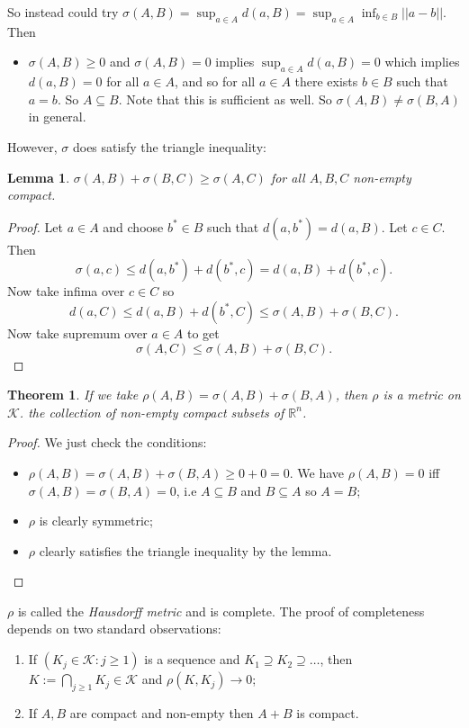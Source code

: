 \documentclass[a4paper, 10pt, twocolumn]{amsart}
\newtheorem*{theorem}{Theorem}
\newtheorem*{lemma}{Lemma}
\theoremstyle{definition}
\newcommand{\bb}[1]{\mathbb{#1}}
\newcommand{\sbs}[0]{\subseteq}
\renewcommand{\cal}[1]{\mathcal{#1}}
\newcommand{\1}{\mathbbm{1}}
\begin{document}
So instead could try $\sigma(A,B) = \sup_{a \in A} d(a,B) = \sup_{a \in A} \inf_{b \in B} ||a-b||$. Then \begin{itemize}
    \item $\sigma(A,B) \ge 0$ and $\sigma(A,B) = 0$ implies $\sup_{a \in A} d(a,B) = 0$ which implies $d(a,B) = 0$ for all $a \in A$, and so for all $a \in A$ there exists $b \in B$ such that $a=b$. So $A \sbs B$. Note that this is sufficient as well. So $\sigma(A,B) \ne \sigma(B,A)$ in general.
\end{itemize}

However, $\sigma$ does satisfy the triangle inequality: 

\begin{lemma}
    $\sigma(A,B)+\sigma(B,C) \ge \sigma(A,C)$ for all $A,B,C$ non-empty compact.
\end{lemma}

\begin{proof}
    Let $a \in A$ and choose $b^\ast \in B$ such that $d(a,b^\ast) = d(a,B)$. Let $c \in C$. Then \[\sigma(a,c) \le d(a,b^\ast) + d(b^\ast,c) = d(a,B) + d(b^\ast,c).\]
    Now take infima over $c \in C$ so \[d(a,C) \le d(a,B)+ d(b^\ast,C) \le \sigma(A,B) + \sigma(B,C).\]
    Now take supremum over $a \in A$ to get \[\sigma(A,C) \le \sigma(A,B)+\sigma(B,C).\]
\end{proof}

\begin{theorem}
    If we take $\rho(A,B) = \sigma(A,B)+\sigma(B,A)$, then $\rho$ is a metric on $\cal{K}$. the collection of non-empty compact subsets of $\bb{R}^n$.
\end{theorem}

\begin{proof}
    We just check the conditions: \begin{itemize}
        \item $\rho(A,B) = \sigma(A,B) + \sigma(B,A) \ge 0+0 =0$. We have $\rho(A,B) = 0$ iff $\sigma(A,B) = \sigma(B,A) = 0$, i.e $A \sbs B$ and $B \sbs A$ so $A=B$;
        \item $\rho$ is clearly symmetric;
        \item $\rho$ clearly satisfies the triangle inequality by the lemma.
    \end{itemize}
\end{proof}

$\rho$ is called the \textit{Hausdorff metric} and is complete. The proof of completeness depends on two standard observations: \begin{enumerate}
    \item If $(K_j \in \cal{K}: j\ge 1)$ is a sequence and $K_1\supseteq K_2\supseteq \ldots$, then $K := \bigcap_{j\ge 1} K_j \in \cal{K}$ and $\rho(K,K_j) \to 0$;
    \item If $A,B$ are compact and non-empty then $A+B$ is compact.
\end{enumerate}
\end{document}
